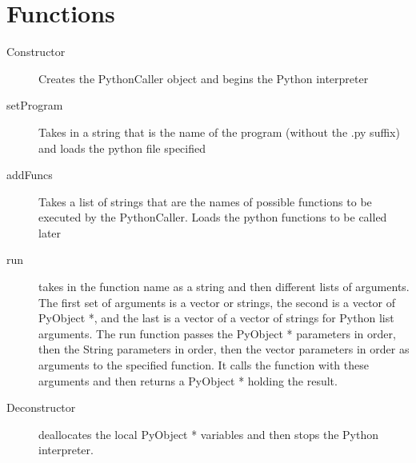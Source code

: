 \documentclass[onecolumn,letterpaper,11pt]{article}
\begin{document}
	\section{Functions}
	\begin{description}
		\item[Constructor] Creates the PythonCaller object and begins the Python interpreter
		\item[setProgram] Takes in a string that is the name of the program (without the .py suffix) and loads the python file specified
		\item[addFuncs] Takes a list of strings that are the names of possible functions to be executed by the PythonCaller. Loads the python functions to be called later
		\item[run] takes in the function name as a string and then different lists of arguments. The first set of arguments is a vector or strings, the second is a vector of PyObject *, and the last is a vector of a vector of strings for Python list arguments. The run function passes the PyObject * parameters in order, then the String parameters in order, then the vector parameters in order as arguments to the specified function. It calls the function with these arguments and then returns a PyObject * holding the result. 
		\item[Deconstructor] deallocates the local PyObject * variables and then stops the Python interpreter.   
	\end{description}
 
	
\end{document}
